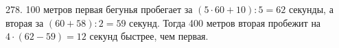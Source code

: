 278. 100 метров первая бегунья пробегает за $(5\cdot60+10):5=62$ секунды, а вторая за $(60+58):2=59$ секунд. Тогда 400 метров вторая пробежит на $4\cdot(62-59)=12$ секунд быстрее, чем первая.\\
